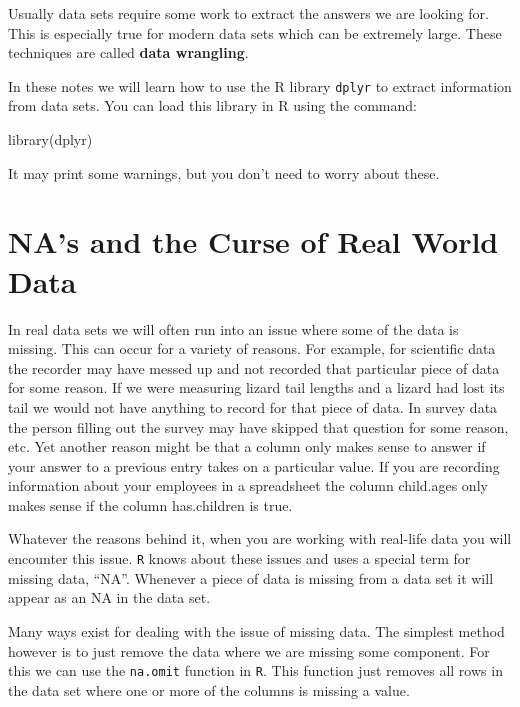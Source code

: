 \documentclass[
]{book}
\newenvironment{Shaded}{\begin{snugshade}}{\end{snugshade}}
\newcommand{\FunctionTok}[1]{\textcolor[rgb]{0.00,0.00,0.00}{#1}}
\newcommand{\NormalTok}[1]{#1}
\theoremstyle{definition}
\theoremstyle{definition}
\theoremstyle{definition}
\theoremstyle{definition}
\theoremstyle{remark}
\begin{document}
Usually data sets require some work to extract the answers we are looking for. This is especially true for modern data sets which can be extremely large. These techniques are called \textbf{data wrangling}.

In these notes we will learn how to use the R library \texttt{dplyr} to extract information from data sets. You can load this library in R using the command:

\begin{Shaded}
\begin{Highlighting}[]
\FunctionTok{library}\NormalTok{(dplyr)}
\end{Highlighting}
\end{Shaded}

It may print some warnings, but you don't need to worry about these.

\hypertarget{nas-and-the-curse-of-real-world-data}{%
\section{NA's and the Curse of Real World Data}\label{nas-and-the-curse-of-real-world-data}}

In real data sets we will often run into an issue where some of the data is missing. This can occur for a variety of reasons. For example, for scientific data the recorder may have messed up and not recorded that particular piece of data for some reason. If we were measuring lizard tail lengths and a lizard had lost its tail we would not have anything to record for that piece of data. In survey data the person filling out the survey may have skipped that question for some reason, etc. Yet another reason might be that a column only makes sense to answer if your answer to a previous entry takes on a particular value. If you are recording information about your employees in a spreadsheet the column child.ages only makes sense if the column has.children is true.

Whatever the reasons behind it, when you are working with real-life data you will encounter this issue. \texttt{R} knows about these issues and uses a special term for missing data, ``NA''. Whenever a piece of data is missing from a data set it will appear as an NA in the data set.

Many ways exist for dealing with the issue of missing data. The simplest method however is to just remove the data where we are missing some component. For this we can use the \texttt{na.omit} function in \texttt{R}. This function just removes all rows in the data set where one or more of the columns is missing a value.
\end{document}
